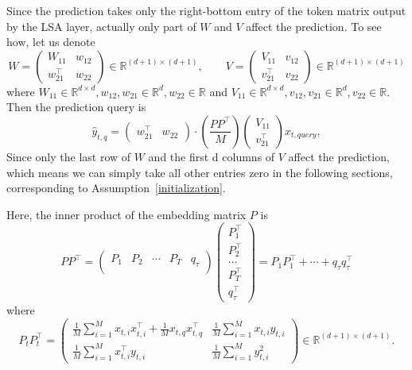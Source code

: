 \documentclass{article}
\theoremstyle{plain}
\theoremstyle{definition}
\theoremstyle{remark}
\begin{document}
Since the prediction takes only the right-bottom entry of the token matrix output by the LSA layer, actually only part of $W$ and $V$ affect the prediction. To see how, let us denote
\[
W = \begin{pmatrix}
    W_{11} & w_{12} \\
    w_{21}^\top & w_{22}
\end{pmatrix}\in \mathbb{R}^{(d+1)\times (d+1)},\qquad 
V = \begin{pmatrix}
    V_{11} & v_{12} \\
    v_{21}^\top & v_{22}
\end{pmatrix}\in \mathbb{R}^{(d+1)\times (d+1)}
\]
where $ W_{11}\in \mathbb{R}^{d\times d},w_{12},w_{21}\in \mathbb{R}^{d},  w_{22}\in \mathbb{R}$ and $V_{11}\in \mathbb{R}^{d\times d},v_{12},v_{21}\in \mathbb{R}^{d}, v_{22}\in \mathbb{R}$. Then the prediction query is 
\[
\hat{y}_{t,q} = \begin{pmatrix}
    w_{21}^\top & w_{22}
\end{pmatrix}\cdot (\frac{PP^\top}{M})\begin{pmatrix}
    V_{11} \\v_{21}^\top
\end{pmatrix}x_{t,query},
\]
Since only the last row of $W$ and the first d columns of $V$ affect the prediction, which means we can simply take all other entries zero in the following sections, corresponding to Assumption~\ref{initialization}.

Here, the inner product of the embedding matrix $P$ is
\[
PP^\top = \begin{pmatrix}
    P_1 & P_2 & \cdots & P_T & q_{\tau}\\
\end{pmatrix}\begin{pmatrix}
    P_1^\top \\ P_2^\top \\ \ldots \\ P_T^\top \\ q^\top_{\tau}
\end{pmatrix} = P_1P_1^\top + \cdots + q_{\tau}q_{\tau}^\top
\]
where\[
P_tP_t^\top = \begin{pmatrix}
 \frac{1}{M}\sum_{i=1}^Mx_{t,i}x^\top_{t,i}+\frac{1}{M}x_{t,q}x_{t,q}^\top & \frac{1}{M}\sum_{i=1}^{M}x_{t,i}y_{t,i}\\
 \frac{1}{M}\sum_{i=1}^Mx_{t,i}^\top y_{t,i} &\frac{1}{M}\sum_{i=1}^M y^2_{t,i}
\end{pmatrix}\in \mathbb{R}^{(d+1)\times (d+1)}.
\]
\end{document}
